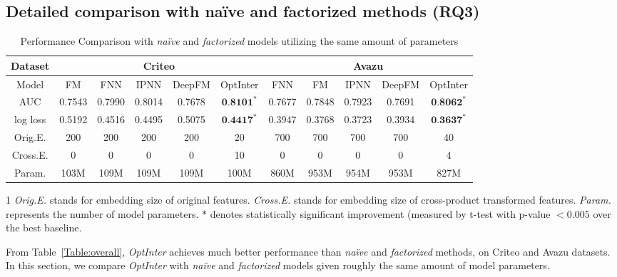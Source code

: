 \documentclass[conference]{IEEEtran}
\begin{document}
 \subsection{Detailed comparison with naïve and factorized methods (RQ3)}
\label{sec:same_budget}


\begin{table*}[!htbp]
    \renewcommand\arraystretch{1.05}
	\centering
	\caption{Performance Comparison with \emph{naïve} and \emph{factorized} models utilizing the same amount of parameters}
	\begin{tabular}{c|cccc|c|cccc|c}
		\hline
		  Dataset & \multicolumn{5}{c|}{Criteo} & \multicolumn{5}{c}{Avazu} \\
		\hline
		  Model         & FM        & FNN       & IPNN      & DeepFM    & OptInter      & FNN      & FM        & IPNN      & DeepFM    & OptInter \\
		\hline
		  AUC           & 0.7543    & 0.7990    & 0.8014    & 0.7678    & $\textbf{0.8101}^{*}$     & 0.7677    & 0.7848    & 0.7923    & 0.7691    & $\textbf{0.8062}^{*}$ \\
		  log loss      & 0.5192    & 0.4516    & 0.4495    & 0.5075    & $\textbf{0.4417}^{*}$     & 0.3947    & 0.3768    & 0.3723    & 0.3934    & $\textbf{0.3637}^{*}$ \\
		  Orig.E.       & 200       & 200       & 200       & 200       & 20              & 700     & 700       & 700       & 700       & 40 \\
		  Cross.E.       & 0         & 0         & 0         & 0         & 10              & 0       & 0         & 0         & 0         & 4 \\
		  Param.        & 103M      & 109M      & 109M      & 109M      & 100M            & 860M    & 953M      & 954M      & 953M      & 827M \\
		\hline
	\end{tabular}
	\begin{tablenotes}
    \footnotesize
    \item[1] \textit{Orig.E.} stands for embedding size of original features. \textit{Cross.E.} stands for embedding size of cross-product transformed features. \textit{Param.} represents the number of model parameters. $*$ denotes statistically significant improvement (measured by t-test with p-value $<0.005$ over the best baseline. 
    \end{tablenotes}
	\label{Table:same_budget}
\end{table*}

From Table~\ref{Table:overall}, \textit{OptInter} achieves much better performance than \emph{naïve} and \emph{factorized} methods,  on Criteo and Avazu datasets.
In this section, we compare \textit{OptInter} with \emph{naïve} and \emph{factorized} models given roughly the same amount of model parameters. 
\end{document}
